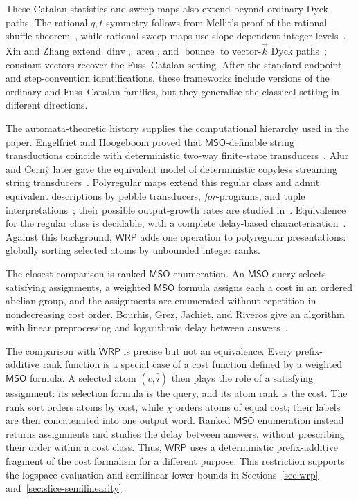 \documentclass[11pt]{article}
\theoremstyle{definition}
\newcommand{\WRP}{\mathsf{WRP}}
\newcommand{\MSO}{\mathsf{MSO}}
\newcommand{\area}{\operatorname{area}}
\newcommand{\dinv}{\operatorname{dinv}}
\newcommand{\bounce}{\operatorname{bounce}}
\begin{document}
These Catalan statistics and sweep maps also extend beyond ordinary Dyck
paths.  The rational $q,t$-symmetry follows from Mellit's proof of the rational
shuffle theorem~\cite{Mellit2021}, while rational sweep maps use
slope-dependent integer levels~\cite{ArmstrongLoehrWarrington2015,
ArmstrongLoehrWarrington2016,ThomasWilliams2018}.  Xin and Zhang extend
$\dinv$, $\area$, and $\bounce$ to vector-$\vec k$ Dyck
paths~\cite{XinZhang2023}; constant vectors recover the Fuss--Catalan setting.
After the standard endpoint and step-convention identifications, these
frameworks include versions of the ordinary and Fuss--Catalan families, but
they generalise the classical setting in different directions.

The automata-theoretic history supplies the computational hierarchy used in
the paper.  Engelfriet and Hoogeboom proved that $\MSO$-definable string
transductions coincide with deterministic two-way finite-state
transducers~\cite{EngelfrietHoogeboom2001}.  Alur and \v{C}ern\'y later gave
the equivalent model of deterministic copyless streaming string
transducers~\cite{AlurCerny2010}.  Polyregular maps extend this regular class
and admit equivalent descriptions by pebble transducers, \emph{for}-programs,
and tuple interpretations~\cite{Bojanczyk2018,BojanczykKieferLhote2019}; their
possible output-growth rates are studied in~\cite{Bojanczyk2023Growth}.
Equivalence for the regular class is decidable, with a complete delay-based
characterisation~\cite{FiliotJeckerLodingWinter2023}.  Against this background,
$\WRP$ adds one operation to polyregular presentations: globally sorting
selected atoms by unbounded integer ranks.

The closest comparison is ranked $\MSO$ enumeration.  An $\MSO$ query selects
satisfying assignments, a weighted $\MSO$ formula assigns each a cost in an
ordered abelian group, and the assignments are enumerated without repetition
in nondecreasing cost order.  Bourhis, Grez, Jachiet, and Riveros give an
algorithm with linear preprocessing and logarithmic delay between
answers~\cite{BourhisEtAl2021}.

The comparison with $\WRP$ is precise but not an equivalence.  Every
prefix-additive rank function is a special case of a cost function defined by
a weighted $\MSO$ formula.  A selected atom $(c,\bar i)$ then plays the role of
a satisfying assignment: its selection formula is the query, and its atom rank
is the cost.  The rank sort orders atoms by cost, while $\chi$ orders atoms of
equal cost; their labels are then concatenated into one output word.  Ranked
$\MSO$ enumeration instead returns assignments and studies the delay between
answers, without prescribing their order within a cost class.  Thus, $\WRP$
uses a deterministic prefix-additive fragment of the cost formalism for a
different purpose.  This restriction supports the logspace evaluation and
semilinear lower bounds in Sections~\ref{sec:wrp}
and~\ref{sec:slice-semilinearity}.
\end{document}
